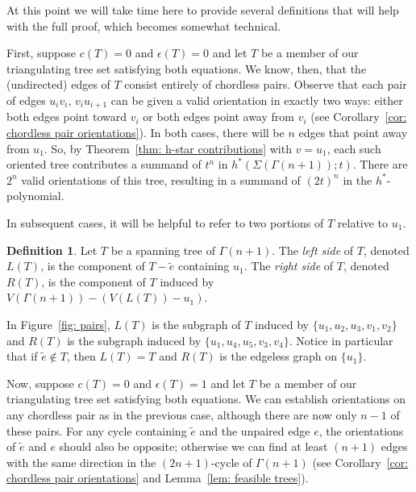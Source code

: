\documentclass{amsart}
\numberwithin{equation}{section}
\theoremstyle{plain}
\theoremstyle{definition}
\newtheorem{defn}[thm]{Definition}
\newcommand{\etilde}{\widetilde{e}}
\begin{document}
At this point we will take time here to provide several definitions that will help with the full proof, which becomes somewhat technical. 

First, suppose $c(T)=0$ and $\epsilon(T)=0$ and let $T$ be a member of our triangulating tree set satisfying both equations. 
We know, then, that the (undirected) edges of $T$ consist entirely of chordless pairs.
Observe that each pair of edges $u_iv_i$, $v_iu_{i+1}$ can be given a valid orientation in exactly two ways: either both edges point toward $v_i$ or both edges point away from $v_i$ (see Corollary~\ref{cor: chordless pair orientations}).
In both cases, there will be $n$ edges that point away from $u_1$.
So, by Theorem~\ref{thm: h-star contributions} with $v=u_1$, each such oriented tree contributes a summand of $t^n$ in $h^*(\Sigma(\Gamma(n+1)); t)$. 
There are $2^n$ valid orientations of this tree, resulting in a summand of $(2t)^n$ in the $h^*$-polynomial.

In subsequent cases, it will be helpful to refer to two portions of $T$ relative to $u_1$.

\begin{defn}
   Let $T$ be a spanning tree of $\Gamma(n+1)$. 
   The \emph{left side} of $T$, denoted $L(T)$, is the component of $T - \etilde$ containing $u_1$.
   The \emph{right side} of $T$, denoted $R(T)$, is the component of $T$ induced by $V(\Gamma(n+1)) - (V(L(T)) - u_1)$.
\end{defn}

In Figure~\ref{fig: pairs}, $L(T)$ is the subgraph of $T$ induced by $\{u_1,u_2,u_3,v_1,v_2\}$ and $R(T)$ is the subgraph induced by $\{u_1,u_4,u_5,v_3,v_4\}$.
Notice in particular that if $\etilde \notin T$, then $L(T) = T$ and $R(T)$
is the edgeless graph on $\{u_1\}$.

Now, suppose $c(T) = 0$ and $\epsilon(T) = 1$ and let $T$ be a member of our triangulating tree set satisfying both equations.
We can establish orientations on any chordless pair as in the previous case, although there are now only $n-1$ of these pairs.
For any cycle containing $\etilde$ and the unpaired edge $e$, the orientations of $\etilde$ and $e$ should also be opposite; otherwise we can find at least $(n+1)$ edges with the same direction in the $(2n+1)$-cycle of $\Gamma(n+1)$ (see Corollary~\ref{cor: chordless pair orientations} and Lemma~\ref{lem: feasible trees}). 
\end{document}
